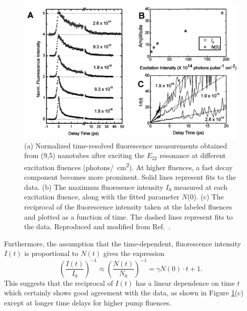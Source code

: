\begin{figure}[H]
	\centering
	\includegraphics[scale=0.35]{images/chapter_prior_works/fluorescence_2_ma_2004}
	\caption{(a) Normalized time-resolved fluorescence measurements obtained from (9,5) nanotubes after exciting the $E_{22}$ resonance at different excitation fluences (photons\si{/\cm \squared}). At higher fluences, a fast decay component becomes more prominent. Solid lines represent fits to the data. (b) The maximum fluoresence intensity $I_0$ measured at each excitation fluence, along with the fitted parameter $N$(0). (c) The reciprocal of the fluorescence intensity taken at the labeled fluences and plotted as a function of time. The dashed lines represent fits to the data. Reproduced and modified from Ref.\ \cite{ma2004ultrafast}.}
	\label{fig:fluorescence_ma_2004}
\end{figure}

Furthermore, the assumption that the time-dependent, fluorescence intensity $I(t)$ is proportional to $ N(t)$ gives the expression
\begin{equation}
  	\left( \dfrac{I(t)}{I_0} \right)^{-1} \approx \left( \dfrac{N(t)}{N_0} \right)^{-1} = \gamma N(0) \cdot t + 1.
\end{equation}
This suggests that the reciprocal of $I(t)$ has a linear dependence on time $t$ which certainly shows good agreement with the data, as shown in Figure \ref{fig:fluorescence_ma_2004}(c) except at longer time delays for higher pump fluences.



